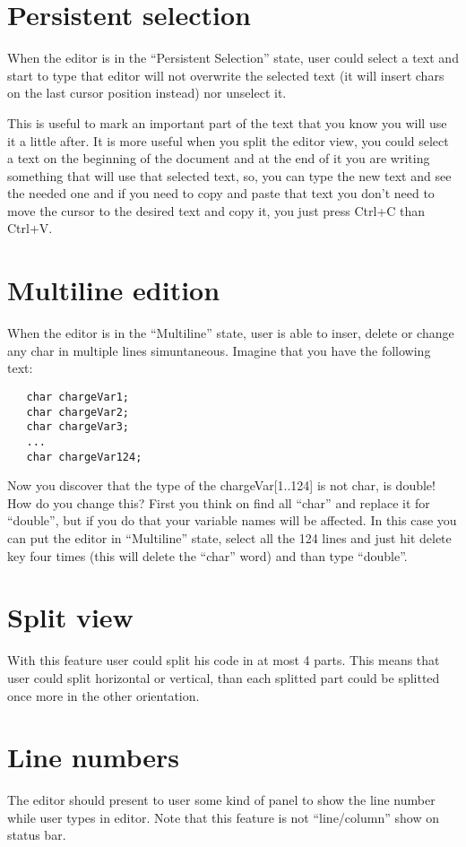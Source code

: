 \documentclass[11pt,a4paper]{report}
\begin{document}
\section{Persistent selection}
When the editor is in the ``Persistent Selection'' state, user could select a text and start to type that editor will not overwrite the selected text (it will insert chars on the last cursor position instead) nor unselect it.

This is useful to mark an important part of the text that you know you will use it a little after. It is more useful when you split the editor view, you could select a text on the beginning of the document and at the end of it you are writing something that will use that selected text, so, you can type the new text and see the needed one and if you need to copy and paste that text you don't need to move the cursor to the desired text and copy it, you just press Ctrl+C than Ctrl+V.

\section{Multiline edition}
When the editor is in the ``Multiline'' state, user is able to inser, delete or change any char in multiple lines simuntaneous. Imagine that you have the following text:
\begin{verbatim}
   char chargeVar1;
   char chargeVar2;
   char chargeVar3;
   ...
   char chargeVar124;
\end{verbatim}
Now you discover that the type of the chargeVar[1..124] is not char, is double! How do you change this? First you think on find all ``char'' and replace it for ``double'', but if you do that your variable names will be affected. In this case you can put the editor in ``Multiline'' state, select all the 124 lines and just hit delete key four times (this will delete the ``char'' word) and than type ``double''.

\section{Split view}
With this feature user could split his code in at most 4 parts. This means that user could split horizontal or vertical, than each splitted part could be splitted once more in the other orientation.

\section{Line numbers}
The editor should present to user some kind of panel to show the line number while user types in editor. Note that this feature is not ``line/column'' show on status bar.
\end{document}
